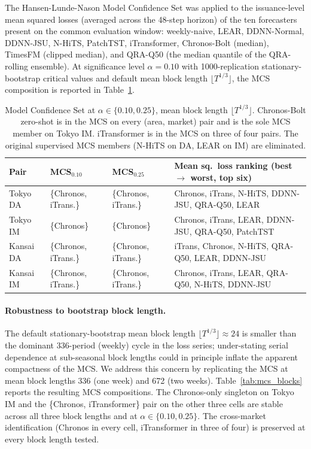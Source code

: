 \documentclass[review,3p,times,authoryear]{elsarticle}
\begin{document}
The Hansen-Lunde-Nason \citep{hansen2011} Model Confidence Set was applied to the issuance-level mean squared losses (averaged across the 48-step horizon) of the ten forecasters present on the common evaluation window: weekly-naive, LEAR, DDNN-Normal, DDNN-JSU, N-HiTS, PatchTST, iTransformer, Chronos-Bolt (median), TimesFM (clipped median), and QRA-Q50 (the median quantile of the QRA-rolling ensemble). At significance level \(\alpha = 0.10\) with 1000-replication stationary-bootstrap critical values and default mean block length \(\lfloor T^{1/3}\rfloor\), the MCS composition is reported in Table~\ref{tab:mcs}.

\begin{table}[t]
\centering\small
\caption{Model Confidence Set at \(\alpha \in \{0.10, 0.25\}\), mean block length \(\lfloor T^{1/3}\rfloor\). Chronos-Bolt zero-shot is in the MCS on every (area, market) pair and is the sole MCS member on Tokyo IM. iTransformer is in the MCS on three of four pairs. The original supervised MCS members (N-HiTS on DA, LEAR on IM) are eliminated.}\label{tab:mcs}
\begin{tabular}{llll}
\toprule
Pair & MCS\(_{0.10}\) & MCS\(_{0.25}\) & Mean sq.\ loss ranking (best $\rightarrow$ worst, top six) \\
\midrule
Tokyo DA  & \{Chronos, iTrans.\} & \{Chronos, iTrans.\} & Chronos, iTrans, N-HiTS, DDNN-JSU, QRA-Q50, LEAR \\
Tokyo IM  & \{Chronos\}          & \{Chronos\}          & Chronos, iTrans, LEAR, DDNN-JSU, QRA-Q50, PatchTST \\
Kansai DA & \{Chronos, iTrans.\} & \{Chronos, iTrans.\} & iTrans, Chronos, N-HiTS, QRA-Q50, LEAR, DDNN-JSU \\
Kansai IM & \{Chronos, iTrans.\} & \{Chronos, iTrans.\} & Chronos, iTrans, LEAR, QRA-Q50, N-HiTS, DDNN-JSU \\
\bottomrule
\end{tabular}
\end{table}

\paragraph{Robustness to bootstrap block length.}
The default stationary-bootstrap mean block length \(\lfloor T^{1/3}\rfloor \approx 24\) is smaller than the dominant 336-period (weekly) cycle in the loss series; under-stating serial dependence at sub-seasonal block lengths could in principle inflate the apparent compactness of the MCS. We address this concern by replicating the MCS at mean block lengths 336 (one week) and 672 (two weeks). Table~\ref{tab:mcs_blocks} reports the resulting MCS compositions. The Chronos-only singleton on Tokyo IM and the \{Chronos, iTransformer\} pair on the other three cells are stable across all three block lengths and at \(\alpha\in\{0.10, 0.25\}\). The cross-market identification (Chronos in every cell, iTransformer in three of four) is preserved at every block length tested.
\end{document}
